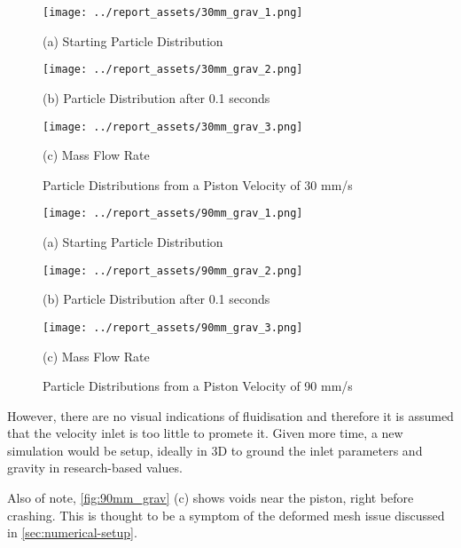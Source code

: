 \begin{figure}[htbp]
    \centering

    \begin{minipage}{0.32\textwidth}
        \centering
        \texttt{[image: ../report\_assets/30mm\_grav\_1.png]}
        \caption*{(a) Starting Particle Distribution}
    \end{minipage}
    \hfill
    \begin{minipage}{0.32\textwidth}
        \centering
        \texttt{[image: ../report\_assets/30mm\_grav\_2.png]}
        \caption*{(b) Particle Distribution after 0.1 seconds}
    \end{minipage}
    \hfill
    \begin{minipage}{0.32\textwidth}
        \centering
        \texttt{[image: ../report\_assets/30mm\_grav\_3.png]}
        \caption*{(c) Mass Flow Rate}
    \end{minipage}
    \caption{Particle Distributions from a Piston Velocity of 30 mm/s}

\end{figure}\label{fig:30mm_grav}
\begin{figure}[htbp]
    \centering

    \begin{minipage}{0.32\textwidth}
        \centering
        \texttt{[image: ../report\_assets/90mm\_grav\_1.png]}
        \caption*{(a) Starting Particle Distribution}
    \end{minipage}
    \hfill
    \begin{minipage}{0.32\textwidth}
        \centering
        \texttt{[image: ../report\_assets/90mm\_grav\_2.png]}
        \caption*{(b) Particle Distribution after 0.1 seconds}
    \end{minipage}
    \hfill
    \begin{minipage}{0.32\textwidth}
        \centering
        \texttt{[image: ../report\_assets/90mm\_grav\_3.png]}
        \caption*{(c) Mass Flow Rate}
    \end{minipage}
    \caption{Particle Distributions from a Piston Velocity of 90 mm/s}

\end{figure}\label{fig:90mm_grav}
However, there are no visual indications of fluidisation and therefore it is assumed that the velocity inlet is too little to promete it. Given more time, a new simulation would be setup, ideally in 3D to ground the inlet parameters and gravity in research-based values. 

Also of note, \autoref{fig:90mm_grav} (c) shows voids near the piston, right before crashing. This is thought to be a symptom of the deformed mesh issue discussed in \autoref{sec:numerical-setup}.
